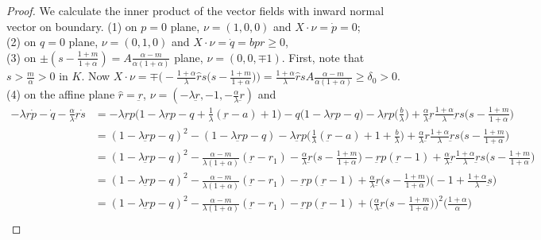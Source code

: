 \documentclass[a4paper,11pt]{article}
\begin{document}
\begin{proof}
 We calculate the inner product of the vector fields with inward normal vector on boundary.
 (1) on $p=0$ plane, $\nu = (1,0,0)$ and $X\cdot\nu = \dot{p}=0$;\\
 (2) on $q=0$ plane, $\nu = (0,1,0)$ and $X\cdot\nu=\dot{q} = bpr\ge0$,\\
 (3) on $\pm\left(s-\frac{1+m}{1+\alpha}\right) = A \frac{\alpha-m}{\alpha(1+\alpha)}$ plane, $\nu = (0,0,\mp1)$. First, note that $s>\frac{m}{\alpha}>0$ in $K$. Now $X\cdot\nu = \mp\Big(-\frac{1+\alpha}{\lambda}\hat{r}s\big(s- \frac{1+m}{1+\alpha}\big)\Big) = \frac{1+\alpha}{\lambda}\hat{r}sA \frac{\alpha-m}{\alpha(1+\alpha)}\ge\delta_0>0$.\\
 (4) on the affine plane $\hat{r}=\underbar{r}$, $\nu = (-\lambda \underbar{r}, -1,-\frac{\alpha}{\lambda}\underbar{r})$ and 
 \begin{align}
  -\lambda \underbar{r}\dot{p} -\dot{q}-\frac{\alpha}{\lambda}\underbar{r}\dot{s} &= -\lambda \underbar{r}p \Big(1-\lambda \underbar{r}p -q + \frac{1}{\lambda}(\underbar{r}-a)+1\Big) - q(1-\lambda \underbar{r}p -q\big) - \lambda \underbar{r}p\Big(\frac{b}{\lambda}\Big) + \frac{\alpha}{\lambda}\underbar{r}\frac{1+\alpha}{\lambda}\underbar{r}s\big(s- \frac{1+m}{1+\alpha}\big)\nonumber\\
  &= (1-\lambda \underbar{r}p -q)^2 - (1-\lambda \underbar{r}p -q) -\lambda \underbar{r}p\Big(\frac{1}{\lambda}(\underbar{r}-a)+1+\frac{b}{\lambda}\Big) + \frac{\alpha}{\lambda}\underbar{r}\frac{1+\alpha}{\lambda}\underbar{r}s\big(s- \frac{1+m}{1+\alpha}\big)\nonumber\\
  &= (1-\lambda \underbar{r}p -q)^2 - \frac{\alpha-m}{\lambda(1+\alpha)}(\underbar{r}-r_1) -\frac{\alpha}{\lambda}\underbar{r}\big(s- \frac{1+m}{1+\alpha}\big) -\underbar{r}p(\underbar{r}-1)+ \frac{\alpha}{\lambda}\underbar{r}\frac{1+\alpha}{\lambda}\underbar{r}s\big(s- \frac{1+m}{1+\alpha}\big)\nonumber\\
  &= (1-\lambda \underbar{r}p -q)^2 - \frac{\alpha-m}{\lambda(1+\alpha)}(\underbar{r}-r_1) -\underbar{r}p(\underbar{r}-1) + \frac{\alpha}{\lambda}\underbar{r}\big(s- \frac{1+m}{1+\alpha}\big)\Big(-1+\frac{1+\alpha}{\lambda}\underbar{s}\Big)\nonumber\\
  &= (1-\lambda \underbar{r}p -q)^2 - \frac{\alpha-m}{\lambda(1+\alpha)}(\underbar{r}-r_1) -\underbar{r}p(\underbar{r}-1) + \Big(\frac{\alpha}{\lambda}\underbar{r}\big(s- \frac{1+m}{1+\alpha}\big)\Big)^2\Big(\frac{1+\alpha}{\alpha}\Big) \nonumber\\

\end{align}
\end{proof}
\end{document}
